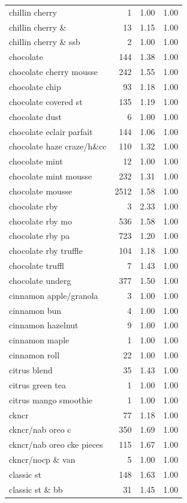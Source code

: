 \begin{table}
\begin{tabular}{lrrr}
chillin cherry & 1 & 1.00 & 1.00 \\
chillin cherry \& & 13 & 1.15 & 1.00 \\
chillin cherry \& ssb & 2 & 1.00 & 1.00 \\
chocolate & 144 & 1.38 & 1.00 \\
chocolate cherry mousse & 242 & 1.55 & 1.00 \\
chocolate chip & 93 & 1.18 & 1.00 \\
chocolate covered st & 135 & 1.19 & 1.00 \\
chocolate dust & 6 & 1.00 & 1.00 \\
chocolate eclair parfait & 144 & 1.06 & 1.00 \\
chocolate haze craze/h\&cc & 110 & 1.32 & 1.00 \\
chocolate mint & 12 & 1.00 & 1.00 \\
chocolate mint mousse & 232 & 1.31 & 1.00 \\
chocolate mousse & 2512 & 1.58 & 1.00 \\
chocolate rby & 3 & 2.33 & 1.00 \\
chocolate rby mo & 536 & 1.58 & 1.00 \\
chocolate rby pa & 723 & 1.20 & 1.00 \\
chocolate rby truffle & 104 & 1.18 & 1.00 \\
chocolate truffl & 7 & 1.43 & 1.00 \\
chocolate underg & 377 & 1.50 & 1.00 \\
cinnamon apple/granola & 3 & 1.00 & 1.00 \\
cinnamon bun & 4 & 1.00 & 1.00 \\
cinnamon hazelnut & 9 & 1.00 & 1.00 \\
cinnamon maple & 1 & 1.00 & 1.00 \\
cinnamon roll & 22 & 1.00 & 1.00 \\
citrus blend & 35 & 1.43 & 1.00 \\
citrus green tea & 1 & 1.00 & 1.00 \\
citrus mango smoothie & 1 & 1.00 & 1.00 \\
ckncr & 77 & 1.18 & 1.00 \\
ckncr/nab oreo c & 350 & 1.69 & 1.00 \\
ckncr/nab oreo cke pieces & 115 & 1.67 & 1.00 \\
ckncr/nocp \& van & 5 & 1.00 & 1.00 \\
classic st & 148 & 1.63 & 1.00 \\
classic st \& bb & 31 & 1.45 & 1.00 \\

\end{tabular}
\end{table}

